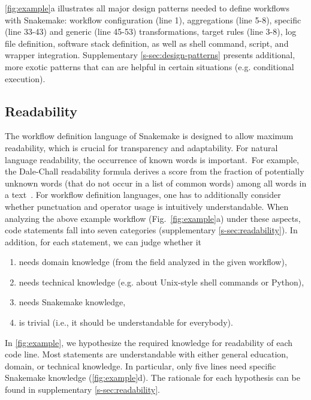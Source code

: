 \documentclass[parskip=half]{scrartcl}
\begin{document}
\autoref{fig:example}a illustrates all major design patterns needed to define workflows with Snakemake: workflow configuration (line 1), aggregations (line 5-8), specific (line 33-43) and generic (line 45-53) transformations, target rules (line 3-8), log file definition, software stack definition, as well as shell command, script, and wrapper integration.
Supplementary \autoref{s-sec:design-patterns} presents additional, more exotic patterns that can are helpful in certain situations (e.g. conditional execution).

\subsection{Readability}

The workflow definition language of Snakemake is designed to allow maximum readability, which is crucial for transparency and adaptability.
For natural language readability, the occurrence of known words is important.~For example, the Dale-Chall readability formula derives a score from the fraction of potentially unknown words (that do not occur in a list of common words) among all words in a text~\parencite{chall_readability_1995}.
For workflow definition languages, one has to additionally consider whether punctuation and operator usage is intuitively understandable.
When analyzing the above example workflow (Fig.~\ref{fig:example}a) under these aspects, code statements fall into seven categories (supplementary \autoref{s-sec:readability}).
In addition, for each statement, we can judge whether it

\begin{enumerate}
	\item needs domain knowledge (from the field analyzed in the given workflow),
	\item needs technical knowledge (e.g. about Unix-style shell commands or Python),
	\item needs Snakemake knowledge,
	\item is trivial (i.e., it should be understandable for everybody).
\end{enumerate}

In \autoref{fig:example}, we hypothesize the required knowledge for readability of each code line.
Most statements are understandable with either general education, domain, or technical knowledge.
In particular, only five lines need specific Snakemake knowledge (\autoref{fig:example}d).
The rationale for each hypothesis can be found in supplementary \autoref{s-sec:readability}.
\end{document}
